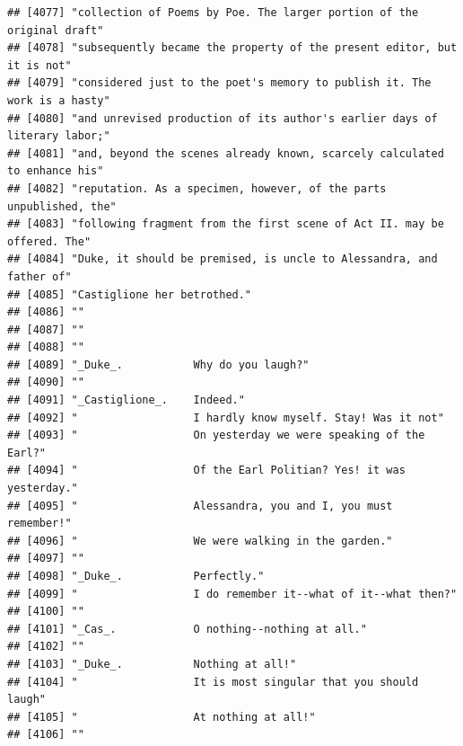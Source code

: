 \documentclass{article}\usepackage[]{graphicx}\usepackage[]{color}
\makeatletter
\newenvironment{kframe}{%
 \def\at@end@of@kframe{}%
 \ifinner\ifhmode%
  \def\at@end@of@kframe{\end{minipage}}%
  \begin{minipage}{\columnwidth}%
 \fi\fi%
 \def\FrameCommand##1{\hskip\@totalleftmargin \hskip-\fboxsep
 \colorbox{shadecolor}{##1}\hskip-\fboxsep
     \hskip-\linewidth \hskip-\@totalleftmargin \hskip\columnwidth}%
 \MakeFramed {\advance\hsize-\width
   \@totalleftmargin\z@ \linewidth\hsize
   \@setminipage}}%
 {\par\unskip\endMakeFramed%
 \at@end@of@kframe}
\newenvironment{knitrout}{}{} %
\makeatother
\begin{document}
\begin{knitrout}
\begin{kframe}
\begin{verbatim}
## [4077] "collection of Poems by Poe. The larger portion of the original draft"        
## [4078] "subsequently became the property of the present editor, but it is not"       
## [4079] "considered just to the poet's memory to publish it. The work is a hasty"     
## [4080] "and unrevised production of its author's earlier days of literary labor;"    
## [4081] "and, beyond the scenes already known, scarcely calculated to enhance his"    
## [4082] "reputation. As a specimen, however, of the parts unpublished, the"           
## [4083] "following fragment from the first scene of Act II. may be offered. The"      
## [4084] "Duke, it should be premised, is uncle to Alessandra, and father of"          
## [4085] "Castiglione her betrothed."                                                  
## [4086] ""                                                                            
## [4087] ""                                                                            
## [4088] ""                                                                            
## [4089] "_Duke_.           Why do you laugh?"                                         
## [4090] ""                                                                            
## [4091] "_Castiglione_.    Indeed."                                                   
## [4092] "                  I hardly know myself. Stay! Was it not"                    
## [4093] "                  On yesterday we were speaking of the Earl?"                
## [4094] "                  Of the Earl Politian? Yes! it was yesterday."              
## [4095] "                  Alessandra, you and I, you must remember!"                 
## [4096] "                  We were walking in the garden."                            
## [4097] ""                                                                            
## [4098] "_Duke_.           Perfectly."                                                
## [4099] "                  I do remember it--what of it--what then?"                  
## [4100] ""                                                                            
## [4101] "_Cas_.            O nothing--nothing at all."                                
## [4102] ""                                                                            
## [4103] "_Duke_.           Nothing at all!"                                           
## [4104] "                  It is most singular that you should laugh"                 
## [4105] "                  At nothing at all!"                                        
## [4106] ""                                                                            

\end{verbatim}
\end{kframe}
\end{knitrout}
\end{document}
